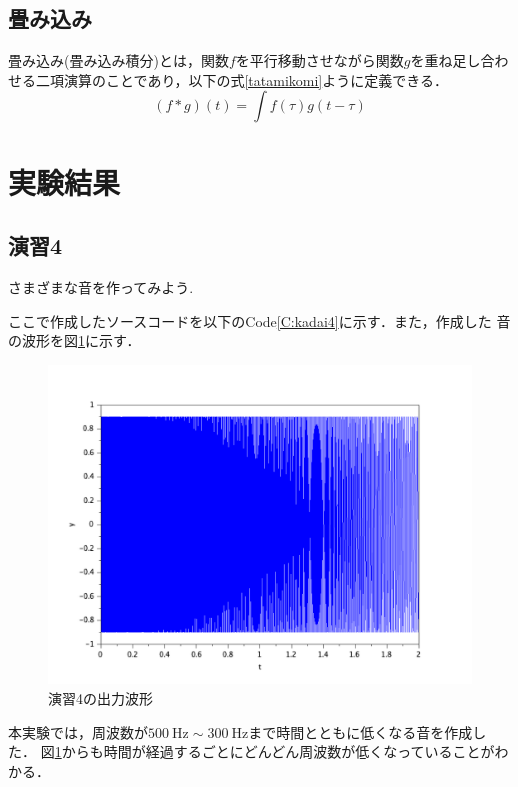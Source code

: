 \documentclass[a4paper,11pt]{jsarticle}
\begin{document}
  \subsection{畳み込み}
    畳み込み(畳み込み積分)とは，関数$f$を平行移動させながら関数$g$を重ね足し合わせる二項演算のことであり，以下の式\ref{tatamikomi}ように定義できる．
    \begin{equation}
      (f * g)(t) = \int{f(\tau)g(t-\tau)} \nonumber   \label{tatamikomi}
    \end{equation}
    

\section{実験結果}
  \subsection{演習4}
    \begin{screen}
      さまざまな音を作ってみよう.
    \end{screen}
    ここで作成したソースコードを以下のCode\ref{C:kadai4}に示す．また，作成した
    音の波形を図\ref{G:kadai4}に示す．
    
    \begin{figure}[H]
      \centering
      \includegraphics[width=0.8\linewidth]{picture/kadai4.png}
      \caption{演習4の出力波形}
      \label{G:kadai4}
    \end{figure}
    本実験では，周波数が$\SI{500}{\hertz} \sim \SI{300}{\hertz}$まで時間とともに低くなる音を作成した．
    図\ref{G:kadai4}からも時間が経過するごとにどんどん周波数が低くなっていることがわかる．
\end{document}
